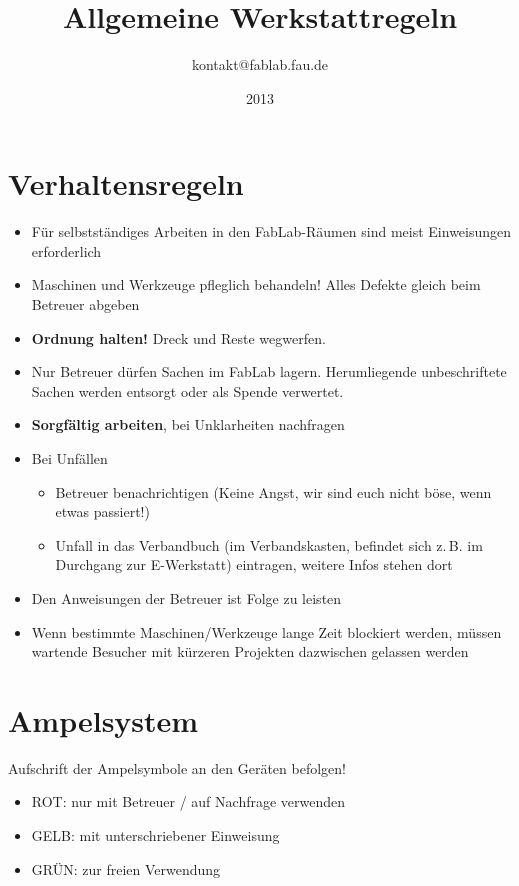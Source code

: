 \documentclass[13pt]{\basedir/fablab-document}
\date{2013}
\author{kontakt@fablab.fau.de}
\title{Allgemeine Werkstattregeln}
\begin{document}
\maketitle

\vbox{\vspace{1cm}}


\section{Verhaltensregeln}
\begin{itemize}
  \item Für selbstständiges Arbeiten in den FabLab-Räumen sind meist Einweisungen erforderlich
  \item Maschinen und Werkzeuge pfleglich behandeln! Alles Defekte gleich beim Betreuer abgeben
  \item \textbf{Ordnung halten!} Dreck und Reste wegwerfen.
  \item Nur Betreuer dürfen Sachen im FabLab lagern. Herumliegende unbeschriftete Sachen werden entsorgt oder als Spende verwertet. 
  \item \textbf{Sorgfältig arbeiten}, bei Unklarheiten nachfragen
  \item Bei Unfällen
  \begin{itemize}
  	\item Betreuer benachrichtigen (Keine Angst, wir sind euch nicht böse, wenn etwas passiert!)
  	\item Unfall in das Verbandbuch (im Verbandskasten, befindet sich z.\,B. im Durchgang zur E-Werkstatt) eintragen, weitere Infos stehen dort
  \end{itemize} 
  \item Den Anweisungen der Betreuer ist Folge zu leisten
  \item Wenn bestimmte Maschinen/Werkzeuge lange Zeit blockiert werden, müssen wartende Besucher mit kürzeren Projekten dazwischen gelassen werden
\end{itemize}
\vbox{\vspace{0,5cm}}

\section{Ampelsystem}
Aufschrift der Ampelsymbole an den Geräten befolgen!
\begin{itemize}
 \item ROT: nur mit Betreuer / auf Nachfrage verwenden
 \item GELB: mit unterschriebener Einweisung
 \item GRÜN: zur freien Verwendung
\end{itemize}
\end{document}
